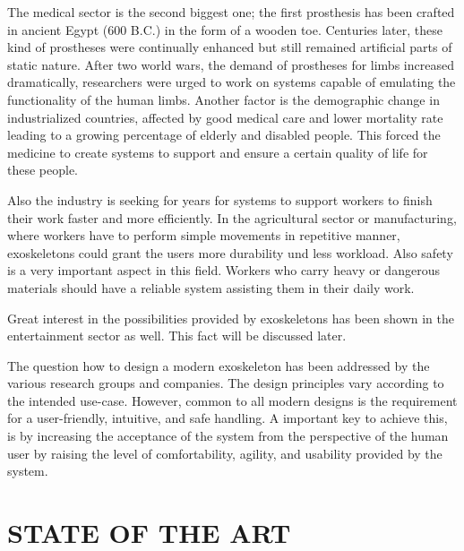 \documentclass[letterpaper, 10 pt, conference]{ieeeconf}  %
\begin{document}

The medical sector is the second biggest one; the first prosthesis has been crafted in ancient Egypt (600 B.C.)
in the form of a wooden toe. Centuries later, these kind of prostheses were continually enhanced but still remained
artificial parts of static nature. After two world wars, the demand of prostheses for limbs increased dramatically,
researchers were urged to work on systems capable of emulating the functionality of the human limbs. Another factor
is the demographic change in industrialized countries, affected by good medical care and lower mortality rate leading
to a growing percentage of elderly and disabled people. This forced the medicine to create systems to support and
ensure a certain quality of life for these people.


Also the industry is seeking for years for systems to support workers to finish their work faster and more efficiently.
In the agricultural sector or manufacturing, where workers have to perform simple movements in repetitive manner,
exoskeletons could grant the users more durability und less workload. Also safety is a very important aspect in this field.
Workers who carry heavy or dangerous materials should have a reliable system assisting them in their daily
work.

Great interest in the possibilities provided by exoskeletons has been shown in the entertainment sector as well.
This fact will be discussed later.


The question how to design a modern exoskeleton has been addressed by the various research groups and companies. The
design principles vary according to the intended use-case. However, common to all modern designs is the requirement for a
user-friendly, intuitive, and safe handling. A important key to achieve this, is by increasing the acceptance of the
system from the perspective of the human user by raising the level of comfortability, agility, and usability provided
by the system. 



\section{STATE OF THE ART}
\end{document}
